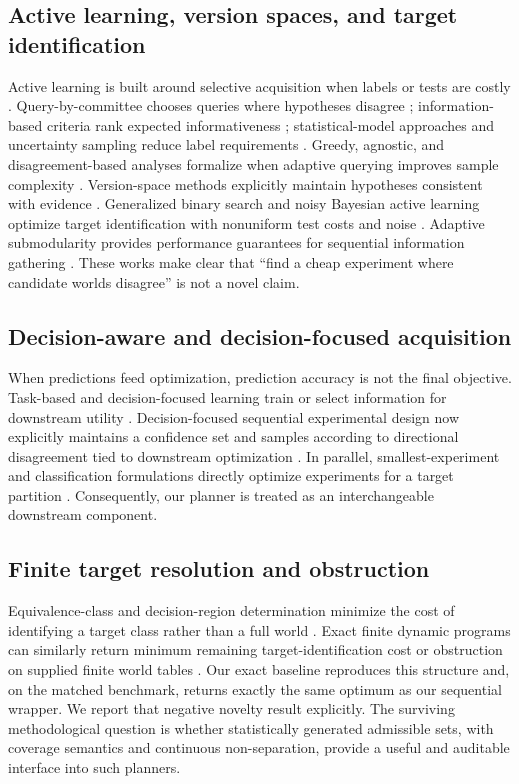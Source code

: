 \documentclass[11pt]{article}
\begin{document}
\subsection{Active learning, version spaces, and target identification}
Active learning is built around selective acquisition when labels or tests are costly \parencite{settles2009}. Query-by-committee chooses queries where hypotheses disagree \parencite{seung1992}; information-based criteria rank expected informativeness \parencite{mackay1992}; statistical-model approaches and uncertainty sampling reduce label requirements \parencite{cohn1996,tong2001}. Greedy, agnostic, and disagreement-based analyses formalize when adaptive querying improves sample complexity \parencite{dasgupta2005,balcan2006,dasgupta2007,hanneke2014}. Version-space methods explicitly maintain hypotheses consistent with evidence \parencite{hsu2010}. Generalized binary search and noisy Bayesian active learning optimize target identification with nonuniform test costs and noise \parencite{nowak2011,golovin2010}. Adaptive submodularity provides performance guarantees for sequential information gathering \parencite{golovin2011}. These works make clear that ``find a cheap experiment where candidate worlds disagree'' is not a novel claim.

\subsection{Decision-aware and decision-focused acquisition}
When predictions feed optimization, prediction accuracy is not the final objective. Task-based and decision-focused learning train or select information for downstream utility \parencite{donti2017,wilder2019,elmachtoub2022,bertsimas2020}. Decision-focused sequential experimental design now explicitly maintains a confidence set and samples according to directional disagreement tied to downstream optimization \parencite{wan2026}. In parallel, smallest-experiment and classification formulations directly optimize experiments for a target partition \parencite{healy2026}. Consequently, our planner is treated as an interchangeable downstream component.

\subsection{Finite target resolution and obstruction}
Equivalence-class and decision-region determination minimize the cost of identifying a target class rather than a full world \parencite{golovin2010,javdani2014}. Exact finite dynamic programs can similarly return minimum remaining target-identification cost or obstruction on supplied finite world tables \parencite{brown2026}. Our exact baseline reproduces this structure and, on the matched benchmark, returns exactly the same optimum as our sequential wrapper. We report that negative novelty result explicitly. The surviving methodological question is whether statistically generated admissible sets, with coverage semantics and continuous non-separation, provide a useful and auditable interface into such planners.
\end{document}
